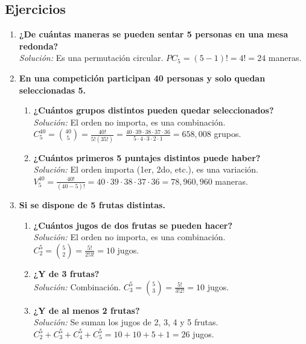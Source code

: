 \documentclass[12pt, letterpaper]{article}
\begin{document}
\subsection{Ejercicios}
\begin{enumerate}
	\item \textbf{¿De cuántas maneras se pueden sentar 5 personas en una mesa redonda?} \\
	      \textit{Solución:} Es una permutación circular. $PC_5 = (5-1)! = 4! = 24$ maneras.

	\item \textbf{En una competición participan 40 personas y solo quedan seleccionadas 5.}
	      \begin{enumerate}
		      \item \textbf{¿Cuántos grupos distintos pueden quedar seleccionados?} \\
		            \textit{Solución:} El orden no importa, es una combinación. \\
		            $C_5^{40} = \binom{40}{5} = \frac{40!}{5!(35!)} = \frac{40 \cdot 39 \cdot 38 \cdot 37 \cdot 36}{5 \cdot 4 \cdot 3 \cdot 2 \cdot 1} = 658,008$ grupos.
		      \item \textbf{¿Cuántos primeros 5 puntajes distintos puede haber?} \\
		            \textit{Solución:} El orden importa (1er, 2do, etc.), es una variación. \\
		            $V_5^{40} = \frac{40!}{(40-5)!} = 40 \cdot 39 \cdot 38 \cdot 37 \cdot 36 = 78,960,960$ maneras.
	      \end{enumerate}

	\item \textbf{Si se dispone de 5 frutas distintas.}
	      \begin{enumerate}
		      \item \textbf{¿Cuántos jugos de dos frutas se pueden hacer?} \\
		            \textit{Solución:} El orden no importa, es una combinación. \\
		            $C_2^5 = \binom{5}{2} = \frac{5!}{2!3!} = 10$ jugos.
		      \item \textbf{¿Y de 3 frutas?} \\
		            \textit{Solución:} Combinación. $C_3^5 = \binom{5}{3} = \frac{5!}{3!2!} = 10$ jugos.
		      \item \textbf{¿Y de al menos 2 frutas?} \\
		            \textit{Solución:} Se suman los jugos de 2, 3, 4 y 5 frutas. \\
		            $C_2^5 + C_3^5 + C_4^5 + C_5^5 = 10 + 10 + 5 + 1 = 26$ jugos.
	      \end{enumerate}
\end{enumerate}
\end{document}
